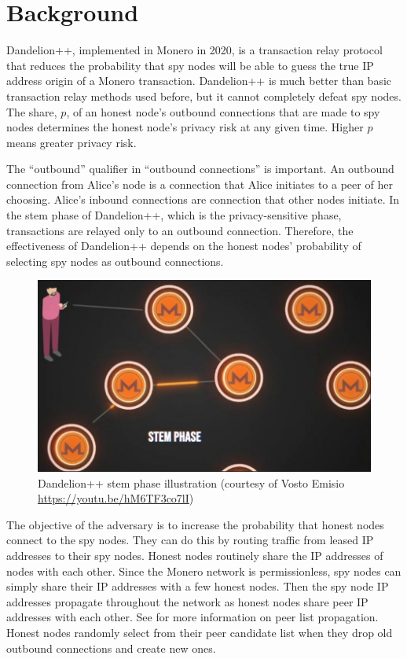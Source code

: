 \documentclass[usletter,11pt,english,openany]{article}
\begin{document}
\section{Background}

Dandelion++, implemented in Monero in 2020, is a transaction relay
protocol that reduces the probability that spy nodes will be able
to guess the true IP address origin of a Monero transaction. Dandelion++
is much better than basic transaction relay methods used before, but
it cannot completely defeat spy nodes. The share, $p$, of an honest
node's outbound connections that are made to spy nodes determines
the honest node's privacy risk at any given time. Higher $p$ means
greater privacy risk.

The ``outbound'' qualifier in ``outbound connections'' is important.
An outbound connection from Alice's node is a connection that Alice
initiates to a peer of her choosing. Alice's inbound connections are
connection that other nodes initiate. In the stem phase of Dandelion++,
which is the privacy-sensitive phase, transactions are relayed only
to an outbound connection. Therefore, the effectiveness of Dandelion++
depends on the honest nodes' probability of selecting spy nodes as
outbound connections.

\begin{figure}
\begin{centering}
\caption{Dandelion++ stem phase illustration (courtesy of Vosto Emisio \protect\href{https://youtu.be/hM6TF3co7lI}{https://youtu.be/hM6TF3co7lI})}
\par\end{centering}
\centering{}\includegraphics[scale=0.5]{images/stem-phase}
\end{figure}

The objective of the adversary is to increase the probability that
honest nodes connect to the spy nodes. They can do this by routing
traffic from leased IP addresses to their spy nodes. Honest nodes
routinely share the IP addresses of nodes with each other. Since the
Monero network is permissionless, spy nodes can simply share their
IP addresses with a few honest nodes. Then the spy node IP addresses
propagate throughout the network as honest nodes share peer IP addresses
with each other. See \cite{Cao2020} for more information on peer
list propagation. Honest nodes randomly select from their peer candidate
list when they drop old outbound connections and create new ones.
\end{document}
